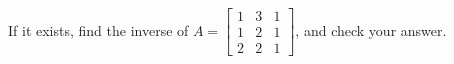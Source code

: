 If it exists, find the inverse of 
$A = \begin{bmatrix} 1 & 3 & 1 \\ 1 & 2 & 1 \\ 2 & 2 & 1\end{bmatrix}$, 
and check your answer.